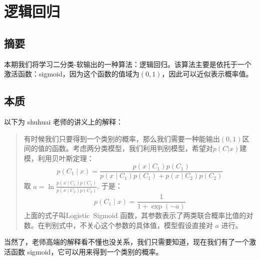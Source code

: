 \documentclass{report}
\begin{document}
\section{逻辑回归}
\subsection{摘要}
本期我们将学习二分类-软输出的一种算法：逻辑回归。该算法主要是依托于一个激活函数：sigmoid，因为这个函数的值域为$(0, 1)$，因此可以近似表示概率值。
\subsection{本质}
以下为 shuhuai 老师的讲义上的解释：
\begin{quotation}
	有时候我们只要得到一个类别的概率，那么我们需要一种能输出$(0, 1)$区间的值的函数。考虑两分类模型，我们利用判别模型，希望对$p(C|x)$建模，利用贝叶斯定理：
$$
p\left(C_{1} \mid x\right)=\frac{p\left(x \mid C_{1}\right) p\left(C_{1}\right)}{p\left(x \mid C_{1}\right) p\left(C_{1}\right)+p\left(x \mid C_{2}\right) p\left(C_{2}\right)}
$$
取 $a=\ln \frac{p\left(x \mid C_{1}\right) p\left(C_{1}\right)}{p\left(x \mid C_{2}\right) p\left(C_{2}\right)}$, 于是：
$$
p\left(C_{1} \mid x\right)=\frac{1}{1+\exp (-a)}
$$
上面的式子叫Logistic\ Sigmoid 函数，其参数表示了两类联合概率比值的对数。在判别式中，不关心这个参数的具体值，模型假设直接对 $a$ 进行。
\end{quotation}
当然了，老师高端的解释看不懂也没关系，我们只需要知道，现在我们有了一个激活函数 sigmoid，它可以用来得到一个类别的概率。
\end{document}
